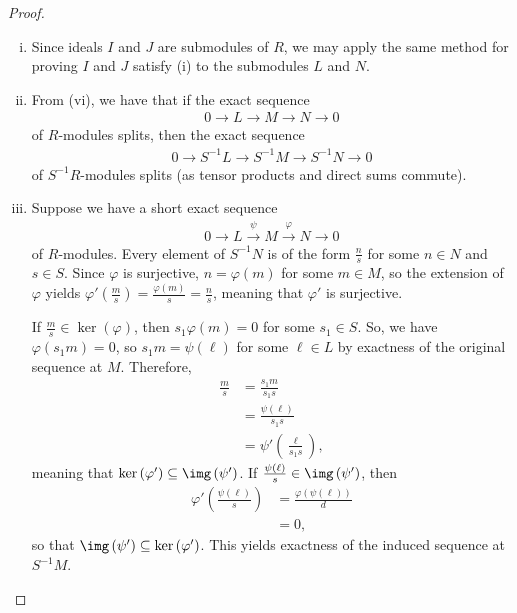 \documentclass[10pt]{mypackage}
\begin{document}
\begin{proof}
\begin{enumerate}[(i)]
      Finally, the contraction of $S^{-1}Q$ is the saturation of $Q$, consisting of the elements $r\in R$ such that $sr\in Q$ for some $s\in S$. Since $Q$ is $P$-primary, the definition of primary implies that if $sr\in Q$ and $s\notin P$, then $r\in Q$, whence the contraction of $S^{-1}Q$ is $Q$.
    \item Since ideals $I$ and $J$ are submodules of $R$, we may apply the same method for proving $I$ and $J$ satisfy (i) to the submodules $L$ and $N$.
    \item From (vi), we have that if the exact sequence
      \begin{align*}
        0\rightarrow L\rightarrow M\rightarrow N\rightarrow 0
      \end{align*}
      of $R$-modules splits, then the exact sequence
      \begin{align*}
        0\rightarrow S^{-1}L\rightarrow S^{-1}M\rightarrow S^{-1}N\rightarrow 0
      \end{align*}
      of $S^{-1}R$-modules splits (as tensor products and direct sums commute).
    \item Suppose we have a short exact sequence 
      \begin{align*}
        0\rightarrow L\xrightarrow{\psi} M\xrightarrow{\varphi} N\rightarrow 0
      \end{align*}
      of $R$-modules. Every element of $S^{-1}N$ is of the form $\frac{n}{s}$ for some $n\in N$ and $s\in S$. Since $\varphi$ is surjective, $n = \varphi(m)$ for some $m\in M$, so the extension of $\varphi$ yields $\varphi'\left( \frac{m}{s} \right) = \frac{\varphi(m)}{s} = \frac{n}{s}$, meaning that $\varphi'$ is surjective.

      If $\frac{m}{s}\in \ker\left( \varphi \right)$, then $s_1\varphi(m) = 0$ for some $s_1\in S$. So, we have $\varphi\left( s_1m \right)= 0$, so $s_1m = \psi(\ell)$ for some $\ell\in L$ by exactness of the original sequence at $M$. Therefore,
      \begin{align*}
        \frac{m}{s} &= \frac{s_1m}{s_1s}\\
                    &= \frac{\psi(\ell)}{s_1s}\\
                    &= \psi'\left( \frac{\ell}{s_1s} \right),
      \end{align*}
      meaning that $\ker\left( \varphi' \right)\subseteq \img\left( \psi' \right)$. If $\frac{\psi(\ell)}{s}\in \img\left( \psi' \right)$, then
      \begin{align*}
        \varphi'\left( \frac{\psi(\ell)}{s} \right) &= \frac{\varphi\left( \psi(\ell) \right)}{d}\\
                                                    &= 0,
      \end{align*}
      so that $\img\left( \psi' \right)\subseteq \ker\left( \varphi' \right)$. This yields exactness of the induced sequence at $S^{-1}M$.


\end{enumerate}
\end{proof}
\end{document}
